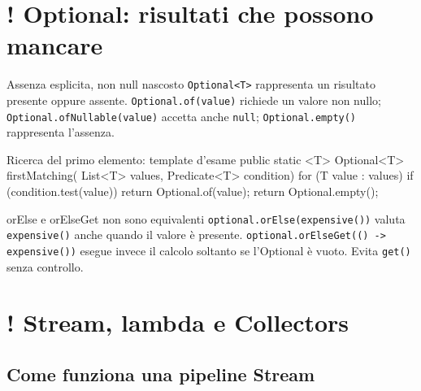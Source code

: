 ﻿\documentclass[10pt,a4paper]{article}
\newcommand{\cmd}[1]{\texttt{#1}}
\DeclareRobustCommand{\exammark}{%
  \texorpdfstring{\textcolor{examred}{\bfseries\Large !}\hspace{.18em}}{! }%
}
\newcommand{\topicsection}[1]{\Needspace{12\baselineskip}\section{#1}}
\newcommand{\topicsubsection}[1]{\Needspace{10\baselineskip}\subsection{#1}}
\begin{document}
\topicsection{\exammark Optional: risultati che possono mancare}

\begin{concept}{Assenza esplicita, non null nascosto}
\cmd{Optional<T>} rappresenta un risultato presente oppure assente.
\cmd{Optional.of(value)} richiede un valore non nullo;
\cmd{Optional.ofNullable(value)} accetta anche \cmd{null};
\cmd{Optional.empty()} rappresenta l'assenza.
\end{concept}

\begin{codebox}{Ricerca del primo elemento: template d'esame}
public static <T> Optional<T> firstMatching(
        List<T> values,
        Predicate<T> condition) {
    for (T value : values) {
        if (condition.test(value)) {
            return Optional.of(value);
        }
    }
    return Optional.empty();
}
\end{codebox}

\begin{examtrap}{orElse e orElseGet non sono equivalenti}
\cmd{optional.orElse(expensive())} valuta \cmd{expensive()} anche quando il
valore è presente. \cmd{optional.orElseGet(() -> expensive())} esegue invece
il calcolo soltanto se l'Optional è vuoto. Evita \cmd{get()} senza controllo.
\end{examtrap}

\topicsection{\exammark Stream, lambda e Collectors}

\topicsubsection{Come funziona una pipeline Stream}
\end{document}
